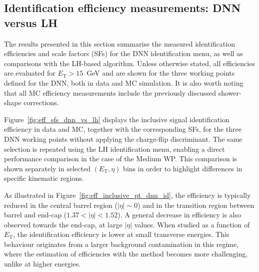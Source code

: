 \subsection{Identification efficiency measurements: DNN versus LH}



The results presented in this section summarise the measured identification efficiencies and scale factors (SFs) for the DNN identification menu, as well as comparisons with the LH-based algorithm. Unless otherwise stated, all efficiencies are evaluated for $E_{\mathrm{T}}>15$~GeV and are shown for the three working points defined for the DNN, both in data and MC simulation. It is also worth noting that all MC efficiency measurements include the previously discussed shower-shape corrections.

Figure~\ref{fig:eff_sfs_dnn_vs_lh} displays the inclusive signal identification efficiency in data and MC, together with the corresponding SFs, for the three DNN working points without applying the charge-flip discriminant. The same selection is repeated using the LH identification menu, enabling a direct performance comparison in the case of the Medium WP. This comparison is shown separately in selected $(E_{\mathrm{T}},\eta)$ bins in order to highlight differences in specific kinematic regions. 

As illustrated in Figure~\ref{fig:eff_inclusive_pt_dnn_id}, the efficiency is typically reduced in the central barrel region ($|\eta|\sim0$) and in the transition region between barrel and end-cap ($1.37 < |\eta| < 1.52$). A general decrease in efficiency is also observed towards the end-cap, at large $|\eta|$ values. When studied as a function of $E_{\mathrm{T}}$, the identification efficiency is lower at small transverse energies. This behaviour originates from a larger background contamination in this regime, where the estimation of efficiencies with the \zmass method becomes more challenging, unlike at higher energies.

